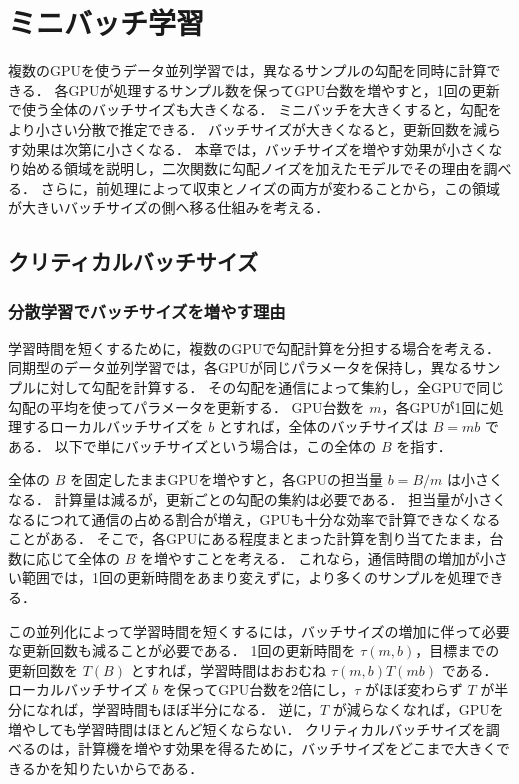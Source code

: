 \documentclass[../main.tex]{subfiles}
\begin{document}
\ifSubfilesClassLoaded{\setcounter{chapter}{3}}{}

\chapter{ミニバッチ学習}

複数のGPUを使うデータ並列学習では，異なるサンプルの勾配を同時に計算できる．
各GPUが処理するサンプル数を保ってGPU台数を増やすと，1回の更新で使う全体のバッチサイズも大きくなる．
ミニバッチを大きくすると，勾配をより小さい分散で推定できる．
バッチサイズが大きくなると，更新回数を減らす効果は次第に小さくなる．
本章では，バッチサイズを増やす効果が小さくなり始める領域を説明し，二次関数に勾配ノイズを加えたモデルでその理由を調べる．
さらに，前処理によって収束とノイズの両方が変わることから，この領域が大きいバッチサイズの側へ移る仕組みを考える．

\section{クリティカルバッチサイズ}
\label{sec:critical-batch-size}

\subsection{分散学習でバッチサイズを増やす理由}

学習時間を短くするために，複数のGPUで勾配計算を分担する場合を考える．
同期型のデータ並列学習では，各GPUが同じパラメータを保持し，異なるサンプルに対して勾配を計算する．
その勾配を通信によって集約し，全GPUで同じ勾配の平均を使ってパラメータを更新する．
GPU台数を $m$，各GPUが1回に処理するローカルバッチサイズを $b$ とすれば，全体のバッチサイズは $B=mb$ である．
以下で単にバッチサイズという場合は，この全体の $B$ を指す．

全体の $B$ を固定したままGPUを増やすと，各GPUの担当量 $b=B/m$ は小さくなる．
計算量は減るが，更新ごとの勾配の集約は必要である．
担当量が小さくなるにつれて通信の占める割合が増え，GPUも十分な効率で計算できなくなることがある．
そこで，各GPUにある程度まとまった計算を割り当てたまま，台数に応じて全体の $B$ を増やすことを考える．
これなら，通信時間の増加が小さい範囲では，1回の更新時間をあまり変えずに，より多くのサンプルを処理できる．

この並列化によって学習時間を短くするには，バッチサイズの増加に伴って必要な更新回数も減ることが必要である．
1回の更新時間を $\tau(m,b)$，目標までの更新回数を $T(B)$ とすれば，学習時間はおおむね $\tau(m,b)T(mb)$ である．
ローカルバッチサイズ $b$ を保ってGPU台数を2倍にし，$\tau$ がほぼ変わらず $T$ が半分になれば，学習時間もほぼ半分になる．
逆に，$T$ が減らなくなれば，GPUを増やしても学習時間はほとんど短くならない．
クリティカルバッチサイズを調べるのは，計算機を増やす効果を得るために，バッチサイズをどこまで大きくできるかを知りたいからである．
\end{document}
